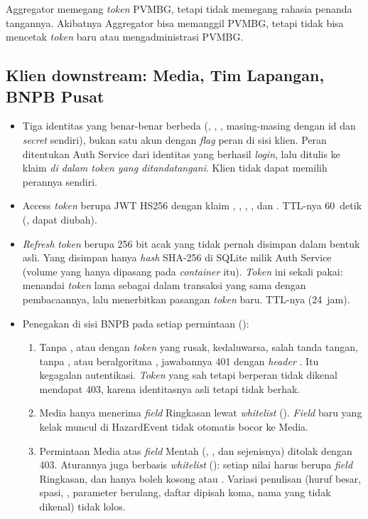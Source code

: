 Aggregator memegang \emph{token} PVMBG, tetapi tidak memegang rahasia penanda tangannya. Akibatnya Aggregator
bisa memanggil PVMBG, tetapi tidak bisa mencetak \emph{token} baru atau mengadministrasi PVMBG.

\subsection{Klien downstream: Media, Tim Lapangan, BNPB Pusat}

\begin{itemize}
 \item Tiga identitas yang benar-benar berbeda (, , , masing-masing dengan id dan \emph{secret} sendiri), bukan satu akun dengan \emph{flag} peran di sisi klien. Peran ditentukan Auth Service dari identitas yang berhasil \emph{login}, lalu ditulis ke klaim  \emph{di dalam token yang ditandatangani}. Klien tidak dapat memilih perannya sendiri.
 \item Access \emph{token} berupa JWT HS256 dengan klaim , , , , dan . TTL-nya 60~detik (, dapat diubah).
 \item \emph{Refresh} \emph{token} berupa 256 bit acak yang tidak pernah disimpan dalam bentuk asli. Yang disimpan hanya \emph{hash} SHA-256 di SQLite milik Auth Service (volume yang hanya dipasang pada \emph{container} itu). \emph{Token} ini sekali pakai:  menandai \emph{token} lama sebagai  dalam transaksi yang sama dengan pembacaannya, lalu menerbitkan pasangan \emph{token} baru. TTL-nya  (24~jam).
 \item Penegakan di sisi BNPB pada setiap permintaan ():
  \begin{enumerate}
   \item Tanpa , atau dengan \emph{token} yang rusak, kedaluwarsa, salah tanda tangan, tanpa , atau beralgoritma , jawabannya 401 dengan \emph{header} . Itu kegagalan autentikasi. \emph{Token} yang sah tetapi berperan tidak dikenal mendapat 403, karena identitasnya asli tetapi tidak berhak.
   \item Media hanya menerima \emph{field} Ringkasan lewat \emph{whitelist} (). \emph{Field} baru yang kelak muncul di HazardEvent tidak otomatis bocor ke Media.
   \item Permintaan Media atas \emph{field} Mentah (, , dan sejenisnya) ditolak dengan 403. Aturannya juga berbasis \emph{whitelist} (): setiap nilai  harus berupa \emph{field} Ringkasan, dan  hanya boleh kosong atau . Variasi penulisan (huruf besar, spasi, , parameter berulang, daftar dipisah koma, nama yang tidak dikenal) tidak lolos.

\end{enumerate}
\end{itemize}
